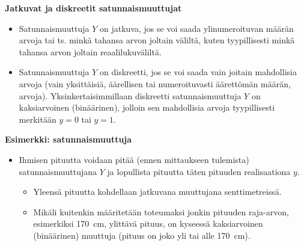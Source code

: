 \documentclass[
]{book}
\providecommand{\tightlist}{%
  \setlength{\itemsep}{0pt}\setlength{\parskip}{0pt}}
\begin{document}
\begin{defblock}{}

\textbf{Jatkuvat ja diskreetit satunnaismuuttujat}

\begin{itemize}
\tightlist
\item
  Satunnaismuuttuja \(Y\) on jatkuva, jos se voi saada ylinumeroituvan määrän arvoja tai ts. minkä tahansa arvon joltain väliltä, kuten tyypillisesti minkä tahansa arvon joltain reaalilukuväliltä.
\item
  Satunnaismuuttuja \(Y\) on diskreetti, jos se voi saada vain joitain mahdollisia arvoja (vain yksittäisiä, äärellisen tai numeroituvasti äärettömän määrän, arvoja). Yksinkertaisimmillaan diskreetti satunnaismuuttuja \(Y\) on kaksiarvoinen (binäärinen), jolloin sen mahdollisia arvoja tyypillisesti merkitään \(y=0\) tai \(y=1\).
\end{itemize}

\end{defblock}

\begin{eblock}{}

\textbf{Esimerkki: satunnaismuuttuja}

\begin{itemize}
\tightlist
\item
  Ihmisen pituutta voidaan pitää (ennen mittaukseen tulemista) satunnaismuuttujana \(Y\) ja lopullista pituutta täten pituuden realisaationa \(y\).

  \begin{itemize}
  \tightlist
  \item
    Yleensä pituutta kohdellaan jatkuvana muuttujana senttimetreissä.
  \item
    Mikäli kuitenkin määritetään toteumaksi jonkin pituuden raja-arvon, esimerkiksi 170~cm, ylittävä pituus, on kyseessä kaksiarvoinen (binäärinen) muuttuja (pituus on joko yli tai alle 170~cm).
  \end{itemize}
\end{itemize}

\end{eblock}
\end{document}
